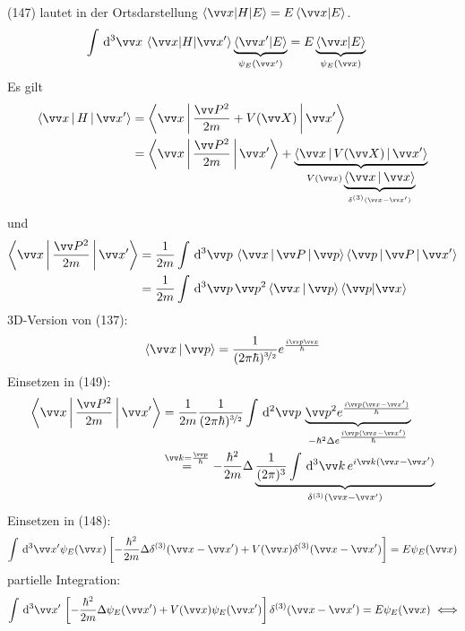 \documentclass[a4paper]{scrartcl}
\begin{document}
{(147) lautet in der Ortsdarstellung $\braket{ \vv x | H | E} = E \braket{ \vv x | E}$.
\begin{align}
\int \dd^3 \vv x \, \braket{ \vv x | H | \vv x'} \underbrace{ \braket{\vv x ' | E}}_{\psi_E(\vv x')} & = E \underbrace{ \braket{ \vv x | E}}_{\psi_E(\vv x)}
\end{align}
Es gilt
\begin{align*}
\Braket{ \vv x | H | \vv x'} & = \Braket{ \vv x| \frac{ \vv P^2}{2m} + V( \vv X) | \vv x'} \\
& = \Braket{ \vv x | \frac{ \vv P^2}{2m} | \vv x'} + \underbrace{\Braket{ \vv x | V(\vv X) | \vv x'}}_{V(\vv x) \underbrace{\Braket{ \vv x | \vv x }}_{\delta^{(3)}(\vv x - \vv x')}}
\end{align*}
und
\begin{align}
\begin{split}
\Braket{ \vv x | \frac{ \vv P^2}{2m} | \vv x'} & = \frac1{2m} \int \dd^3 \vv p \, \Braket{ \vv x | \vv P | \vv p }\Braket{ \vv p | \vv P | \vv x'} \\
& = \frac1{2m} \int \dd^3 \vv p \, \vv p^2 \Braket{ \vv x | \vv p }\braket{ \vv p | \vv x}
\end{split}
\end{align}
3D-Version von (137):
\begin{align} 
\Braket{ \vv x | \vv p } = \frac1{(2 \pi \hbar)^{\nicefrac32}} e^{\frac{i \vv p \vv x}{\hbar}}
\end{align}
Einsetzen in (149):
\begin{align}
\begin{split}
\Braket{ \vv x | \frac{ \vv P^2}{2m} | \vv x' } & = \frac1{2m} \frac1{(2\pi \hbar)^{\nicefrac32}} \int \dd^2 \vv p \, \underbrace{ \vv p^2 e^{\frac{ i \vv p ( \vv x  - \vv x')} \hbar}}_{- \hbar^2 \Delta e^{\frac{i \vv p ( \vv x - \vv x')}\hbar}} \\
& \stackrel{ \vv k = \frac{\vv p}{\hbar}}=  - \frac{\hbar^2}{2m} \Delta\underbrace{ \frac1{(2\pi)^3} \int \dd^3 \vv k \, e^{i \vv k ( \vv x - \vv x')}}_{\delta^{(3)}(\vv x - \vv x')}
\end{split}
\end{align}
Einsetzen in (148):
$$\int \dd^3 \vv x' \psi_E(\vv x) \left[ - \frac{\hbar^2}{2m} \Delta \delta^{(3)} (\vv x - \vv x') + V( \vv x) \delta^{(3)} (\vv x - \vv x') \right] = E \psi_E(\vv x)$$
partielle Integration:
\begin{align}
\int \dd^3 \vv x' \, \left[ - \frac{\hbar^2}{2m} \Delta \psi_E( \vv x') + V(\vv x) \psi_E(\vv x') \right] \delta^{(3)}(\vv x - \vv x') & = E \psi_E(\vv x) \ \Longleftrightarrow \notag \\

\end{align}}
\end{document}
